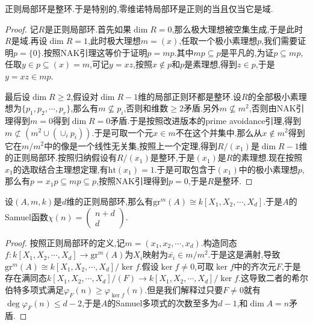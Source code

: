 正则局部环是整环.于是特别的,零维诺特局部环是正则的当且仅当它是域.
\begin{proof}
	
	记$R$是正则局部环.首先如果$\dim R=0$,那么极大理想被空集生成,于是此时$R$是域.再设$\dim R=1$,此时极大理想$m=(x)$,任取一个极小素理想$p$,我们需要证明$p=\{0\}$.按照NAK引理这等价于证明$p=mp$.其中$mp\subseteq p$是平凡的,为证$p\subseteq mp$,任取$y\in p\subseteq (x)=m$,可记$y=xz$,按照$x\not\in p$和$p$是素理想,得到$z\in p$,于是$y=xz\in mp$.
	
	最后设$\dim R\ge2$,假设对$\dim R-1$维的局部正则环都是整环.设$R$的全部极小素理想为$\{p_1,p_2,\cdots,p_r\}$,那么有$m\not\subseteq p_i$,否则和维数$\ge2$矛盾.另外$m\not\subseteq m^2$,否则由NAK引理得到$m=0$得到$\dim R=0$矛盾.于是按照改进版本的prime avoidance引理,得到$m\not\subset\left(m^2\cup(\cup_ip_i)\right)$.于是可取一个元$x\in m$不在这个并集中.那么从$x\not\in m^2$得到它在$m/m^2$中的像是一个线性无关集,按照上一个定理,得到$R/(x_1)$是$\dim R-1$维的正则局部环.按照归纳假设有$R/(x_1)$是整环,于是$(x_1)$是$R$的素理想.现在按照$x_1$的选取结合主理想定理,有$\mathrm{ht}(x_1)=1$.于是可取包含于$(x_1)$中的极小素理想$p$,那么有$p=x_1p\subseteq mp\subseteq p$,按照NAK引理得到$p=0$,于是$R$是整环.
\end{proof}

设$(A,m,k)$是$d$维的正则局部环,那么有$\mathrm{gr}^m(A)\cong k[X_1,X_2,\cdots,X_d]$.于是$A$的Samuel函数$\chi(n)=\left(\begin{array}{c}n+d\\d\end{array}\right)$.
\begin{proof}
	
	按照正则局部环的定义,记$m=(x_1,x_2,\cdots,x_d)$.构造同态$f:k[X_1,X_2,\cdots,X_d]\to\mathrm{gr}^m(A)$为$X_i$映射为$\overline{x_i}\in m/m^2$.于是这是满射,导致$\mathrm{gr}^m(A)\cong k[X_1,X_2,\cdots,X_d]/\ker f$.假设$\ker f\not=0$,可取$\ker f$中的齐次元$F$,于是存在满同态$k[X_1,X_2,\cdots,X_d]/(F)\to k[X_1,X_2,\cdots,X_d]/\ker f$.这导致二者的希尔伯特多项式满足$\varphi_F(n)\ge\varphi_{\ker f}(n)$.但是我们解释过只要$F\not=0$就有$\deg\varphi_F(n)\le d-2$,于是$A$的Samuel多项式的次数至多为$d-1$,和$\dim A=n$矛盾.
\end{proof}


